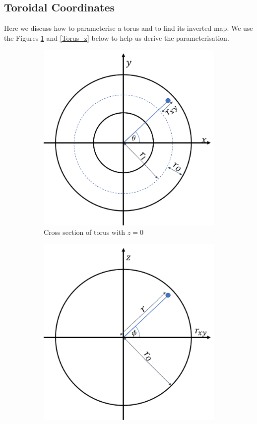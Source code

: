 \documentclass[12pt,a4paper]{article}
\begin{document}
\subsection{Toroidal Coordinates}
Here we discuss how to parameterise a torus and to find its inverted map. We use the Figures \ref{Torus_XY} and \ref{Torus_z} below to help us derive the parameterisation.
\begin{figure}[H]
 \begin{subfigure}{0.5\textwidth}
     \includegraphics[width=\textwidth]{Pics/TorusCordsXY.png}
     \caption{Cross section of torus with $z=0$}
     \label{Torus_XY}
 \end{subfigure}
 \hfill
 \begin{subfigure}{0.5\textwidth}
     \includegraphics[width=\textwidth]{Pics/TorusCordsr_XYZ.png}

\end{subfigure}
\end{figure}
\end{document}
